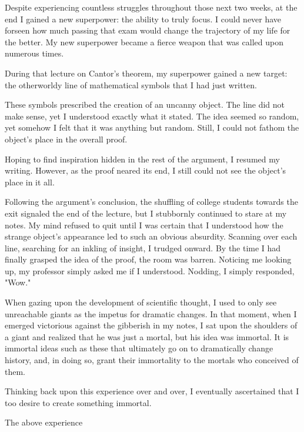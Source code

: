 \documentclass[12pt]{article}
\begin{document}
  Despite experiencing countless struggles throughout those next two weeks, at the end I gained a new superpower: the ability to truly focus. I could never have forseen how much passing that exam would change the trajectory of my life for the better. My new superpower became a fierce weapon that was called upon numerous times.


  During that lecture on Cantor's theorem, my superpower gained a new target: the otherworldy line of mathematical symbols that I had just written.


These symbols prescribed the creation of an uncanny object. The line did not make sense, yet I understood exactly what it stated. The idea seemed so random, yet somehow I felt that it was anything but random. Still, I could not fathom the object's place in the overall proof.


Hoping to find inspiration hidden in the rest of the argument, I resumed my writing. However, as the proof neared its end, I still could not see the object's place in it all.


Following the argument's conclusion, the shuffling of college students towards the exit signaled the end of the lecture, but I stubbornly continued to stare at my notes. My mind refused to quit until I was certain that I understood how the strange object's appearance led to such an obvious absurdity. Scanning over each line, searching for an inkling of insight, I trudged onward. By the time I had finally grasped the idea of the proof, the room was barren. Noticing me looking up, my professor simply asked me if I understood. Nodding, I simply responded, "Wow."

When gazing upon the development of scientific thought, I used to only see unreachable giants as the impetus for dramatic changes. In that moment, when I emerged victorious against the gibberish in my notes, I sat upon the shoulders of a giant and realized that he was just a mortal, but his idea was immortal. It is immortal ideas such as these that ultimately go on to dramatically change history, and, in doing so, grant their immortality to the mortals who conceived of them.

Thinking back upon this experience over and over, I eventually ascertained that I too desire to create something immortal.

The above experience



\end{document}
